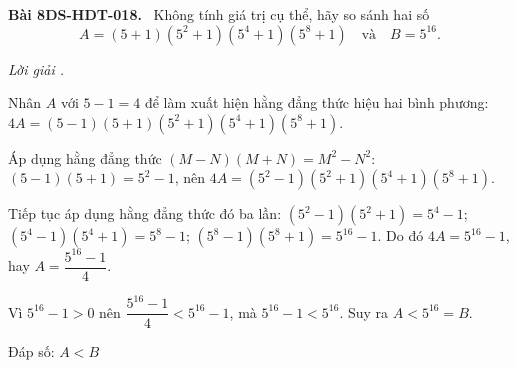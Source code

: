 \documentclass[12pt,a4paper]{article}
\newenvironment{problem}[1][]{\par\medskip\noindent\textbf{Bài #1.}\ }{\par}
\newenvironment{solution}[1][]{\par\noindent\textit{Lời giải #1.}\par}{\par}
\begin{document}
\begin{problem}[8DS-HDT-018]
Không tính giá trị cụ thể, hãy so sánh hai số
\[ A = (5 + 1)(5^2 + 1)(5^4 + 1)(5^8 + 1) \quad \text{và} \quad B = 5^{16}. \]

\begin{solution}
Nhân $A$ với $5 - 1 = 4$ để làm xuất hiện hằng đẳng thức hiệu hai bình phương: $4A = (5 - 1)(5 + 1)(5^2 + 1)(5^4 + 1)(5^8 + 1)$.

Áp dụng hằng đẳng thức $(M - N)(M + N) = M^2 - N^2$: $(5 - 1)(5 + 1) = 5^2 - 1$, nên $4A = (5^2 - 1)(5^2 + 1)(5^4 + 1)(5^8 + 1)$.

Tiếp tục áp dụng hằng đẳng thức đó ba lần: $(5^2 - 1)(5^2 + 1) = 5^4 - 1$; $(5^4 - 1)(5^4 + 1) = 5^8 - 1$; $(5^8 - 1)(5^8 + 1) = 5^{16} - 1$. Do đó $4A = 5^{16} - 1$, hay $A = \dfrac{5^{16} - 1}{4}$.

Vì $5^{16} - 1 > 0$ nên $\dfrac{5^{16} - 1}{4} < 5^{16} - 1$, mà $5^{16} - 1 < 5^{16}$. Suy ra $A < 5^{16} = B$.

Đáp số: $\boxed{A < B}$
\end{solution}
\end{problem}
\end{document}
